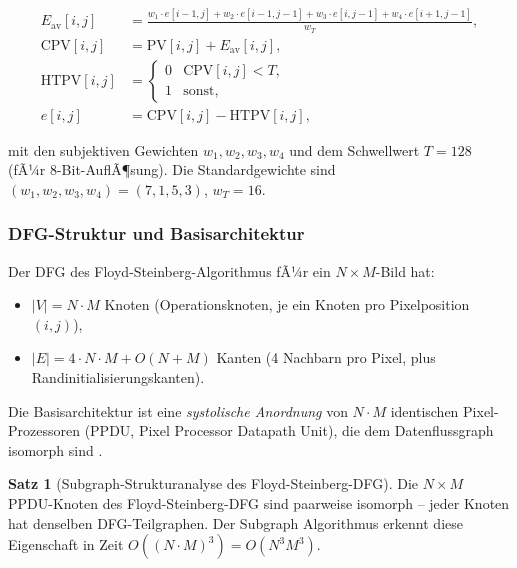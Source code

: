 ﻿\documentclass[a4paper,12pt]{article}
\theoremstyle{definition}
\newtheorem{satz}{Satz}
\begin{document}
\begin{align}
  E_{\text{av}}[i,j] &= \frac{w_1 \cdot e[i-1,j] + w_2 \cdot e[i-1,j-1]
                              + w_3 \cdot e[i,j-1] + w_4 \cdot e[i+1,j-1]}{w_T}, \\[4pt]
  \text{CPV}[i,j]    &= \text{PV}[i,j] + E_{\text{av}}[i,j], \\[4pt]
  \text{HTPV}[i,j]   &= \begin{cases} 0 & \text{CPV}[i,j] < T, \\ 1 & \text{sonst,} \end{cases}\\[4pt]
  e[i,j]             &= \text{CPV}[i,j] - \text{HTPV}[i,j],
\end{align}

mit den subjektiven Gewichten $w_1, w_2, w_3, w_4$ und dem Schwellwert $T = 128$
(fÃ¼r 8-Bit-AuflÃ¶sung). Die Standardgewichte sind $(w_1, w_2, w_3, w_4) = (7, 1, 5, 3)$,
$w_T = 16$.

\subsubsection{DFG-Struktur und Basisarchitektur}

Der DFG des Floyd-Steinberg-Algorithmus fÃ¼r ein $N \times M$-Bild hat:
\begin{itemize}
  \item $|V| = N \cdot M$ Knoten (Operationsknoten, je ein Knoten pro Pixelposition $(i,j)$),
  \item $|E| = 4 \cdot N \cdot M + O(N + M)$ Kanten (4 Nachbarn pro Pixel, plus
        Randinitialisierungskanten).
\end{itemize}

Die Basisarchitektur ist eine \emph{systolische Anordnung} von $N \cdot M$ identischen
Pixel-Prozessoren (PPDU, Pixel Processor Datapath Unit), die dem Datenflussgraph
isomorph sind \cite[S.~554]{ciletti2011}.

\begin{satz}[Subgraph-Strukturanalyse des Floyd-Steinberg-DFG]\label{satz:fs_dfg}
  Die $N \times M$ PPDU-Knoten des Floyd-Steinberg-DFG sind paarweise isomorph --
  jeder Knoten hat denselben DFG-Teilgraphen. Der Subgraph Algorithmus erkennt diese
  Eigenschaft in Zeit $O((N \cdot M)^3) = O(N^3 M^3)$.
\end{satz}
\end{document}
